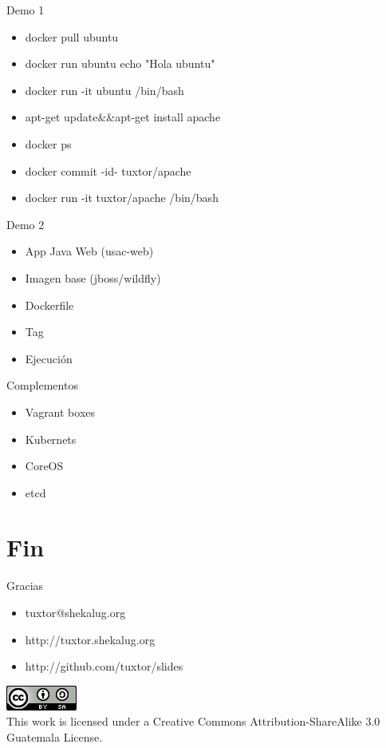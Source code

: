 \documentclass{beamer}
\begin{document}
\begin{frame}{Demo 1}
\begin{itemize}
\item docker pull ubuntu
\item docker run ubuntu echo "Hola ubuntu"
\item docker run -it ubuntu /bin/bash
\item apt-get update\&\&apt-get install apache
\item docker ps
\item docker commit -id- tuxtor/apache
\item docker run -it tuxtor/apache /bin/bash
\end{itemize}
\end{frame}

\begin{frame}{Demo 2}
\begin{itemize}
\item App Java Web (usac-web)
\item Imagen base (jboss/wildfly)
\item Dockerfile
\item Tag
\item Ejecución
\end{itemize}
\end{frame}

\begin{frame}{Complementos}
\begin{itemize}
\item Vagrant boxes
\item Kubernets
\item CoreOS
\item etcd
\end{itemize}
\end{frame}

\section{Fin}

\begin{frame}{Gracias}
\begin{itemize}
\item tuxtor@shekalug.org
\item http://tuxtor.shekalug.org
\item http://github.com/tuxtor/slides
\end{itemize}
\begin{center}
\includegraphics[width=0.1\linewidth]{Images/cclogo}
\\
This work is licensed under a Creative Commons Attribution-ShareAlike 3.0 Guatemala License.
\end{center}
\end{frame}
\end{document}
